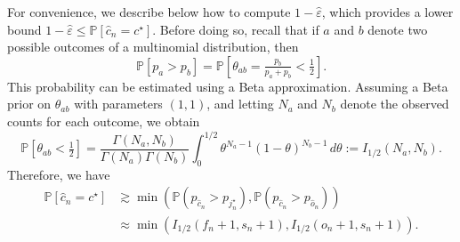 For convenience, we describe below how to compute $1-\hat\varepsilon$, which provides a lower bound $1-\hat{\varepsilon}\leq\mathbb{P}[\widehat{c}_n = c^\star]$.
Before doing so, recall that if $a$ and $b$ denote two possible outcomes of a multinomial distribution, then
$$
\mathbb{P}[p_a>p_b] = \mathbb{P}\left[\theta_{ab}=\tfrac{p_b}{p_a+p_b}<\tfrac{1}{2}\right].
$$
This probability can be estimated using a Beta approximation. Assuming a Beta prior on $\theta_{ab}$ with parameters $(1,1)$, and letting $N_a$ and $N_b$ denote the observed counts for each outcome, we obtain
$$
\mathbb{P}[\theta_{ab}<\tfrac{1}{2}] = \frac{\Gamma(N_a,N_b)}{\Gamma(N_a)\Gamma(N_b)}\int_0^{1/2} \theta^{N_a-1} (1-\theta)^{N_b-1}\, d\theta :=I_{1/2}(N_a, N_b).
$$
Therefore, we have
\begin{align}
    \mathbb{P}[\hat{c}_n = c^\star]&\gtrsim \min\left(\mathbb{P}(p_{\hat{c}_n}>p_{{j^\star_n}}), \mathbb{P}(p_{\hat{c}_n}>p_{{\hat{o}_n}})\right)\nonumber\\
    &\approx \min\left(I_{1/2}(f_n + 1, s_n+1), I_{1/2}({o}_n + 1, s_n+1)\right).\label{eq:lower_bound_for_estimator_correct_no_true}
\end{align}

